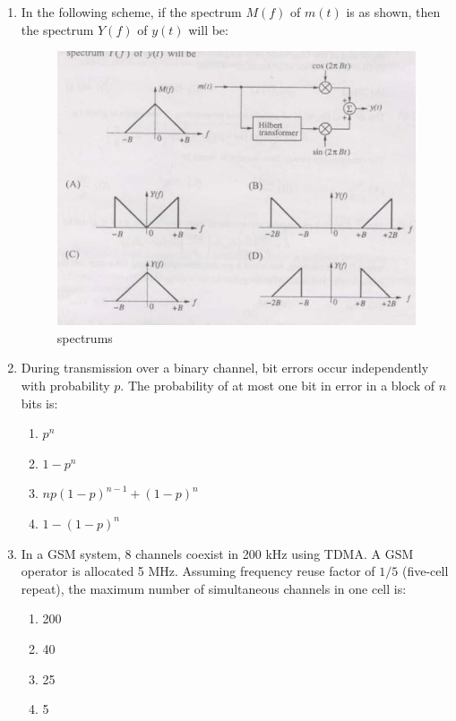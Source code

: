 \documentclass[journal,12pt,onecolumn]{IEEEtran}
\theoremstyle{remark}
\begin{document}
\begin{enumerate}
\item In the following scheme, if the spectrum $M(f)$ of $m(t)$ is as shown, then the spectrum $Y(f)$ of $y(t)$ will be: 
\hfill{}
\begin{figure}[H]
    \centering
    \includegraphics[width=0.9\linewidth]{Q60.jpg}
    \caption{spectrums}
    \label{fig:full_wave}
\end{figure}

\item During transmission over a binary channel, bit errors occur independently with probability $p$. The probability of {at most one} bit in error in a block of $n$ bits is: 
\hfill{}

\begin{enumerate}[label=(\Alph*)]
    \item $p^n$
    \item $1-p^n$
    \item $np(1-p)^{n-1} + (1-p)^n$
    \item $1-(1-p)^n$
\end{enumerate}

\item In a GSM system, 8 channels coexist in 200 kHz using TDMA. A GSM operator is allocated 5 MHz. Assuming frequency reuse factor of $1/5$ (five-cell repeat), the maximum number of simultaneous channels in one cell is: 
\hfill{}
\begin{multicols}{4}
\begin{enumerate}
  \item 200
  \item 40
  \item 25
  \item 5
\end{enumerate}
\end{multicols}


\end{enumerate}
\end{document}

